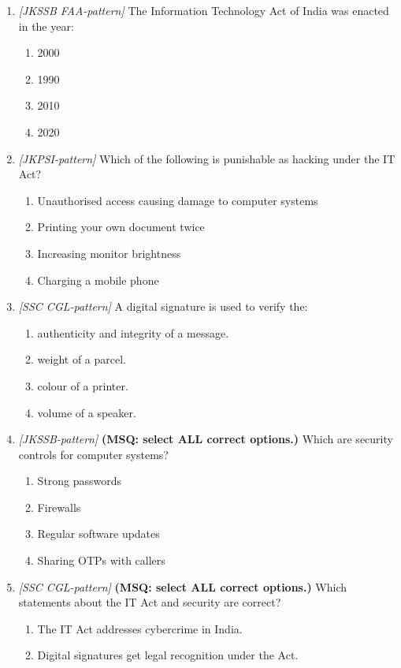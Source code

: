 \begin{enumerate}[label=\textbf{Q\arabic*.}, leftmargin=*]
\item \textit{[JKSSB FAA-pattern]} The Information Technology Act of India was enacted in the year:
  \begin{enumerate}[label=\Alph*.]
    \item 2000
    \item 1990
    \item 2010
    \item 2020
  \end{enumerate}
\item \textit{[JKPSI-pattern]} Which of the following is punishable as hacking under the IT Act?
  \begin{enumerate}[label=\Alph*.]
    \item Unauthorised access causing damage to computer systems
    \item Printing your own document twice
    \item Increasing monitor brightness
    \item Charging a mobile phone
  \end{enumerate}
\item \textit{[SSC CGL-pattern]} A digital signature is used to verify the:
  \begin{enumerate}[label=\Alph*.]
    \item authenticity and integrity of a message.
    \item weight of a parcel.
    \item colour of a printer.
    \item volume of a speaker.
  \end{enumerate}
\item \textit{[JKSSB-pattern]} \textbf{(MSQ: select ALL correct options.)} Which are security controls for computer systems?
  \begin{enumerate}[label=\Alph*.]
    \item Strong passwords
    \item Firewalls
    \item Regular software updates
    \item Sharing OTPs with callers
  \end{enumerate}
\item \textit{[SSC CGL-pattern]} \textbf{(MSQ: select ALL correct options.)} Which statements about the IT Act and security are correct?
  \begin{enumerate}[label=\Alph*.]
    \item The IT Act addresses cybercrime in India.
    \item Digital signatures get legal recognition under the Act.

\end{enumerate}
\end{enumerate}
